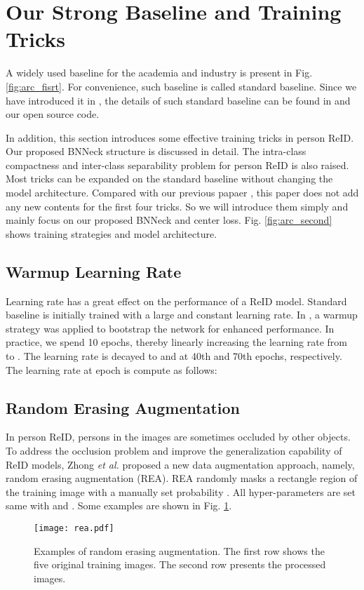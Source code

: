 \documentclass[journal]{IEEEtran}
\begin{document}
\section{Our Strong Baseline and Training Tricks}
A widely used baseline for the academia and industry is present in Fig. \ref{fig:arc_fisrt}.
For convenience, such baseline is called standard baseline.
Since we have introduced it in \cite{luo2019bags}, the details of such standard baseline can be found in \cite{luo2019bags} and our open source code.

In addition, this section introduces some effective training tricks in person ReID. Our proposed BNNeck structure is discussed in detail. The intra-class compactness and inter-class separability problem for person ReID is also raised. Most tricks can be expanded on the standard baseline without changing the model architecture.
Compared with our previous papaer \cite{luo2019bags}, this paper does not add any new contents for the first four tricks.
So we will introduce them simply and mainly focus on our proposed BNNeck and center loss.
Fig. \ref{fig:arc_second} shows training strategies and model architecture.

\subsection{Warmup Learning Rate}



Learning rate has a great effect on the performance of a ReID model. Standard baseline is initially trained with a large and constant learning rate.
In \cite{fan2019spherereid}, a warmup strategy was applied to bootstrap the network for enhanced performance.
In practice, we spend 10 epochs, thereby linearly increasing the learning rate from  to .
The learning rate is decayed to  and  at 40th and 70th epochs, respectively.
The learning rate  at epoch  is compute as follows:




\subsection{Random Erasing Augmentation}
In person ReID, persons in the images are sometimes occluded by other objects.
To address the occlusion problem and improve the generalization capability of ReID models, Zhong \emph{et al.} \cite{zhong2017random} proposed a new data augmentation approach, namely, random erasing augmentation (REA).
REA randomly masks a rectangle region of the training image with a manually set probability .
All hyper-parameters are set same with \cite{zhong2017random} and \cite{luo2019bags}.
Some examples are shown in Fig. \ref{fig:rea}.
\begin{figure}[htb]
\centering
\texttt{[image: rea.pdf]}
\caption{Examples of random erasing augmentation. The first row shows the five original training images. The second row presents the processed images.}
\label{fig:rea}
\vspace{-8mm}
\end{figure}
\end{document}
